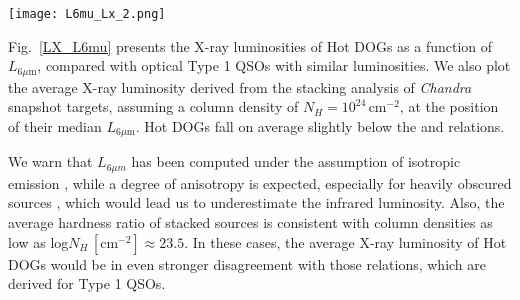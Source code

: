 \documentclass[useAMS,usenatbib]{mnras}
\newcommand*{\chandra}{\textit{Chandra}}
\newcommand*{\nhunits}{\mathrm{cm^{-2}}}
\begin{document}
\begin{figure*} 
	\centering
	\texttt{[image: L6mu\_Lx\_2.png]}
	\caption{Intrinsic X-ray luminosity versus mid-IR luminosity for Hot DOGs. Blue and black symbols represent individual sources presented in this work or collected from the literature. See Appendix~\ref{appendix} for the analysis on W2026+0716. Error bars are given at 68\% confidence level. Downward pointing arrows represent upper limits on the X-ray luminosities at 90\% confidence level. The average X-ray luminosity for stacked sources (derived from Fig.~\ref{L_NH} assuming a column density of $N_H=10^{24}\,\nhunits$) is marked at their median $L_{6\mu\mathrm{m}}$ with a blue star. We also add for comparison the sample of luminous optical Type 1 QSOs collected by \citet{Martocchia17}, and we plot the relations of \citet{Stern15} and \citet{Chen17}. }
	
	\label{LX_L6mu}
\end{figure*}



Fig.~\ref{LX_L6mu} presents the X-ray luminosities of Hot DOGs as a function of $L_{6\mu\mathrm{m}}$, compared with optical Type 1 QSOs with similar luminosities. 
We also plot the average X-ray luminosity derived from the stacking analysis of \chandra\, snapshot targets, assuming a column density of $N_H=10^{24}\,\nhunits$, at the position of their median $L_{6\mu\mathrm{m}}$.
Hot DOGs fall on average slightly below the \cite{Stern15} and \cite{Chen17} relations. 

We warn that $L_{6\mu m}$ has been computed under the assumption of isotropic emission \citep{Tsai15}, while a degree of anisotropy is expected, especially for heavily obscured sources \citep[e.g.][]{Pier92,Fritz06, Nenkova08a,Nenkova08b, Stalevski12,Mateos15}, which would lead us to underestimate the infrared luminosity. Also, the average hardness ratio of stacked sources is consistent with column densities as low as log$N_H\,[\nhunits]\approx23.5$. In these cases, the average X-ray luminosity of Hot DOGs would be in even stronger disagreement with those relations, which are derived for Type 1 QSOs. 
\end{document}
